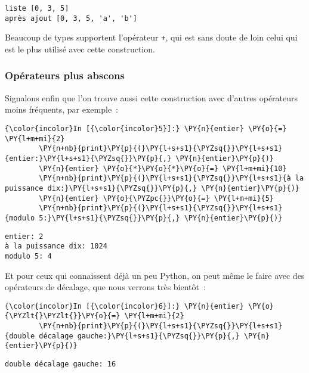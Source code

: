     \begin{Verbatim}[commandchars=\\\{\}]
liste [0, 3, 5]
après ajout [0, 3, 5, 'a', 'b']

    \end{Verbatim}

    Beaucoup de types supportent l'opérateur \texttt{+}, qui est sans doute
de loin celui qui est le plus utilisé avec cette construction.

    \hypertarget{opuxe9rateurs-plus-abscons}{%
\subsubsection{Opérateurs plus
abscons}\label{opuxe9rateurs-plus-abscons}}

    Signalons enfin que l'on trouve aussi cette construction avec d'autres
opérateurs moins fréquents, par exemple~:

    \begin{Verbatim}[commandchars=\\\{\}]
{\color{incolor}In [{\color{incolor}5}]:} \PY{n}{entier} \PY{o}{=} \PY{l+m+mi}{2}
        \PY{n+nb}{print}\PY{p}{(}\PY{l+s+s1}{\PYZsq{}}\PY{l+s+s1}{entier:}\PY{l+s+s1}{\PYZsq{}}\PY{p}{,} \PY{n}{entier}\PY{p}{)}
        \PY{n}{entier} \PY{o}{*}\PY{o}{*}\PY{o}{=} \PY{l+m+mi}{10}
        \PY{n+nb}{print}\PY{p}{(}\PY{l+s+s1}{\PYZsq{}}\PY{l+s+s1}{à la puissance dix:}\PY{l+s+s1}{\PYZsq{}}\PY{p}{,} \PY{n}{entier}\PY{p}{)}
        \PY{n}{entier} \PY{o}{\PYZpc{}}\PY{o}{=} \PY{l+m+mi}{5}
        \PY{n+nb}{print}\PY{p}{(}\PY{l+s+s1}{\PYZsq{}}\PY{l+s+s1}{modulo 5:}\PY{l+s+s1}{\PYZsq{}}\PY{p}{,} \PY{n}{entier}\PY{p}{)}
\end{Verbatim}


    \begin{Verbatim}[commandchars=\\\{\}]
entier: 2
à la puissance dix: 1024
modulo 5: 4

    \end{Verbatim}

    Et pour ceux qui connaissent déjà un peu Python, on peut même le faire
avec des opérateurs de décalage, que nous verrons très bientôt~:

    \begin{Verbatim}[commandchars=\\\{\}]
{\color{incolor}In [{\color{incolor}6}]:} \PY{n}{entier} \PY{o}{\PYZlt{}\PYZlt{}}\PY{o}{=} \PY{l+m+mi}{2}
        \PY{n+nb}{print}\PY{p}{(}\PY{l+s+s1}{\PYZsq{}}\PY{l+s+s1}{double décalage gauche:}\PY{l+s+s1}{\PYZsq{}}\PY{p}{,} \PY{n}{entier}\PY{p}{)}
\end{Verbatim}


    \begin{Verbatim}[commandchars=\\\{\}]
double décalage gauche: 16

    \end{Verbatim}